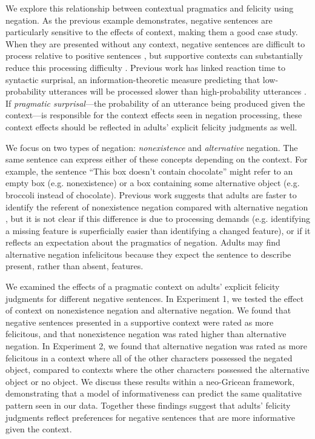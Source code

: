 \documentclass[10pt,letterpaper]{article}
\begin{document}
We explore this relationship between contextual pragmatics and felicity using negation. As the previous example demonstrates, negative sentences are particularly sensitive to the effects of context, making them a good case study.  When they are presented without any context, negative sentences are difficult to process relative to positive sentences \cite{hclark1972, carpenter1975, just1971, just1976}, but supportive contexts can substantially reduce this processing difficulty \cite{wason1965, glenberg1999, ludtke2006, nieuwland2008, dale2011, nordmeyer2014}.   Previous work has linked reaction time to syntactic surprisal, an information-theoretic measure predicting that low-probability utterances will be processed slower than high-probability utterances \cite{levy2008}.  If \emph{pragmatic surprisal}---the probability of an utterance being produced given the context---is responsible for the context effects seen in negation processing, these context effects should be reflected in adults' explicit felicity judgments as well.   

We focus on two types of negation: \emph{nonexistence} and \emph{alternative} negation.  The same sentence can express either of these concepts depending on the context.  For example, the sentence ``This box doesn't contain chocolate'' might refer to an empty box (e.g. nonexistence) or a box containing some alternative object (e.g. broccoli instead of chocolate).  Previous work suggests that adults are faster to identify the referent of nonexistence negation compared with alternative negation \cite{nordmeyer2013, nordmeyer2014b}, but it is not clear if this difference is due to processing demands (e.g. identifying a missing feature is superficially easier than identifying a changed feature), or if it reflects an expectation about the pragmatics of negation.  Adults may find alternative negation infelicitous because they expect the sentence to describe present, rather than absent, features.

We examined the effects of a pragmatic context on adults' explicit felicity judgments for different negative sentences.  In Experiment 1, we tested the effect of context on nonexistence negation and alternative negation.  We found that negative sentences presented in a supportive context were rated as more felicitous, and that nonexistence negation was rated higher than alternative negation.  In Experiment 2, we found that alternative negation was rated as more felicitous in a context where all of the other characters possessed the negated object, compared to contexts where the other characters possessed the alternative object or no object.  We discuss these results within a neo-Gricean framework, demonstrating that a model of informativeness can predict the same qualitative pattern seen in our data.  Together these findings suggest that adults' felicity judgments reflect preferences for negative sentences that are more informative given the context.  
\end{document}
